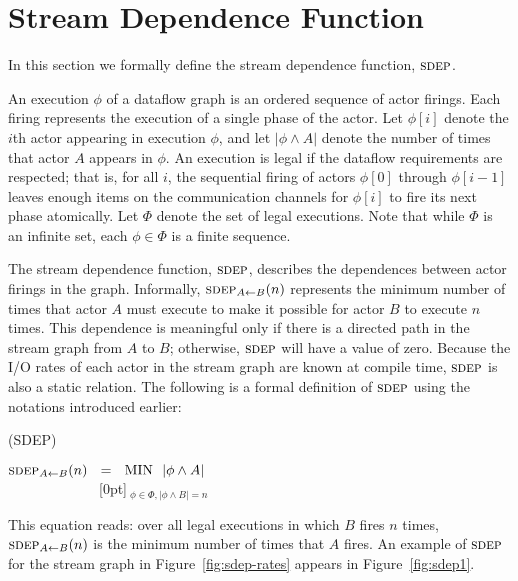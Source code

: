 
\section{Stream Dependence Function}
\label{sec:sdep}

In this section we formally define the stream dependence function,
$\textsc{sdep}$.

An execution $\phi$ of a dataflow graph is an ordered sequence of
actor firings.  Each firing represents the execution of a single phase
of the actor.  Let $\phi[i]$ denote the $i$th actor appearing in
execution $\phi$, and let $|\phi \wedge A|$ denote the number of times
that actor $A$ appears in $\phi$.  An execution is legal if the
dataflow requirements are respected; that is, for all $i$, the
sequential firing of actors $\phi[0]$ through $\phi[i-1]$ leaves
enough items on the communication channels for $\phi[i]$ to fire its
next phase atomically.  Let $\Phi$ denote the set of legal executions.
Note that while $\Phi$ is an infinite set, each $\phi \in \Phi$ is a
finite sequence.

The stream dependence function, $\textsc{sdep}$, describes the dependences
between actor firings in the graph.  Informally, $\sdepf{A}{B}(n)$
represents the minimum number of times that actor $A$ must execute to
make it possible for actor $B$ to execute $n$ times.  This dependence
is meaningful only if there is a directed path in the stream graph
from $A$ to $B$; otherwise, $\textsc{sdep}$ will have a value of zero.
Because the I/O rates of each actor in the stream graph are known at
compile time, $\textsc{sdep}$ is also a static relation.  The following is a
formal definition of $\textsc{sdep}$ using the notations introduced earlier:
\begin{definition}(SDEP)
\begin{center}
$\sdepf{A}{B}(n)~~ = ~~\mbox{MIN}~~|\phi \wedge A|$ \\
~~~~~~~~~~~~~\raisebox{5pt}[0pt]{$~_{\phi \in \Phi, |\phi \wedge B| = n}$}
\label{eq:sdepdef}
\end{center}
\end{definition}
This equation reads: over all legal executions in which $B$ fires $n$
times, $\sdepf{A}{B}(n)$ is the minimum number of times that $A$
fires.  An example of $\textsc{sdep}$ for the stream graph in
Figure~\ref{fig:sdep-rates} appears in Figure~\ref{fig:sdep1}.

